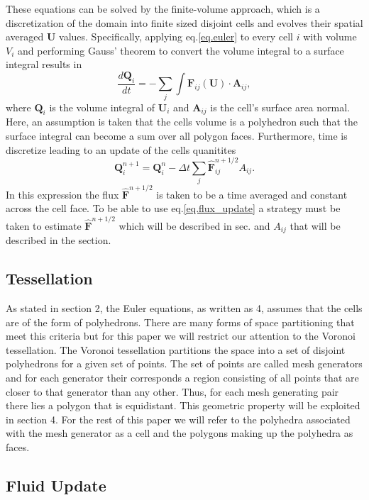 These equations can be solved by the finite-volume approach, which is a discretization
of the domain into finite sized disjoint cells and evolves their spatial averaged
$\mathbf{U}$ values. Specifically, applying eq.\ref{eq.euler} to every cell $i$ with
volume $V_i$ and performing Gauss' theorem to convert the volume integral to a
surface integral results in
%
\begin{equation}
    \label{eq.euler_int}
    \frac{d\mathbf{Q}_i}{dt} =
    -\sum_{j}\int\mathbf{F}_{ij}(\mathbf{U})\cdot\mathbf{A}_{ij},
\end{equation}
%
where $\mathbf{Q}_i$ is the volume integral of $\mathbf{U}_i$ and $\mathbf{A}_{ij}$ is the
cell's surface area normal. Here, an assumption is taken that the cells volume is a polyhedron
such that the surface integral can become a sum over all polygon faces. Furthermore, time
is discretize leading to an update of the cells quanitites
%
\begin{equation}
    \label{eq.flux_update}
    \mathbf{Q}_i^{n+1} = \mathbf{Q}_i^n - \Delta t\sum_j \mathbf{\hat{F}}_{ij}^{n+1/2} A_{ij}.
\end{equation}
%
In this expression the flux $\mathbf{\hat{F}}^{n+1/2}$ is taken to be a time averaged and
constant across the cell face. To be able to use eq.\ref{eq.flux_update} a strategy must
be taken to estimate $\mathbf{\hat{F}}^{n+1/2}$ which will be described in sec. and $A_{ij}$
that will be described in the section.

\subsection{Tessellation}
As stated in section 2, the Euler equations, as written as 4, assumes that the cells are of the
form of polyhedrons. There are many forms of space partitioning that meet this criteria but for
this paper we will restrict our attention to the Voronoi tessellation. The Voronoi tessellation
partitions the space into a set of disjoint polyhedrons for a given set of points. The set of
points are called mesh generators and for each generator their corresponds a region consisting of
all points that are closer to that generator than any other. Thus, for each mesh generating pair
there lies a polygon that is equidistant. This geometric property will be exploited in section 4.
For the rest of this paper we will refer to the polyhedra associated with the mesh generator as 
a cell and the polygons making up the polyhedra as faces.

\subsection{Fluid Update}

